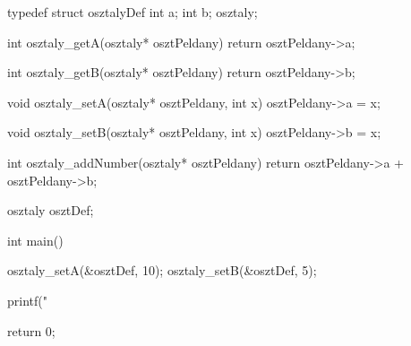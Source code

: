 \begin{cpp}
	typedef struct osztalyDef {
		int a;
		int b;
	} osztaly;
	
	int osztaly_getA(osztaly* osztPeldany) {
		return osztPeldany->a;
	}
	
	int osztaly_getB(osztaly* osztPeldany) {
		return osztPeldany->b;
	}
	
	void osztaly_setA(osztaly* osztPeldany, int x) {
		osztPeldany->a = x;
	}
	
	void osztaly_setB(osztaly* osztPeldany, int x) {
		osztPeldany->b = x;
	}
	
	int osztaly_addNumber(osztaly* osztPeldany) {
		return osztPeldany->a + osztPeldany->b;
	}
	
	osztaly osztDef;
	
	int main()
	{
		osztaly_setA(&osztDef, 10);
		osztaly_setB(&osztDef, 5);
		
		printf("%
		
		return 0;
	}
\end{cpp}